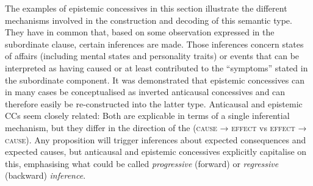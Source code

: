 The examples of epistemic concessives in this section illustrate the different mechanisms involved in the construction and decoding of this semantic type. They have in common that, based on some observation expressed in the subordinate clause, certain inferences are made. Those inferences concern states of affairs (including mental states and personality traits) or events that can be interpreted as having caused or at least contributed to the “symptoms” stated in the subordinate component. It was demonstrated that epistemic concessives can in many cases be conceptualised as inverted anticausal concessives and can therefore easily be re-constructed into the latter type. Anticausal and epistemic CCs seem closely related: Both are explicable in terms of a single inferential mechanism, but they differ in the direction of the  (\textsc{cause} → \textsc{effect} vs \textsc{effect} → \textsc{cause}). Any proposition will trigger inferences about expected consequences and expected causes, but anticausal and epistemic concessives explicitly capitalise on this, emphasising what could be called \textit{progressive} (forward) or \textit{regressive} (backward) \textit{inference}.

